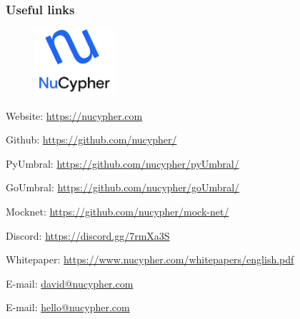 \documentclass[xetex,mathsans,sans,aspectratio=169]{beamer}
\begin{document}
    \begin{frame}
        \frametitle{Useful links}
        \begin{figure}
            \centering
            \includegraphics[width=3cm]{pdf/nucypher_logo.pdf}
        \end{figure}
        Website: \url{https://nucypher.com}

        Github: \url{https://github.com/nucypher/}

        PyUmbral: \url{https://github.com/nucypher/pyUmbral/}

        GoUmbral: \url{https://github.com/nucypher/goUmbral/}

        Mocknet: \url{https://github.com/nucypher/mock-net/}

        Discord: \url{https://discord.gg/7rmXa3S}

        Whitepaper: \url{https://www.nucypher.com/whitepapers/english.pdf}

        E-mail: \url{david@nucypher.com}

        E-mail: \url{hello@nucypher.com}
    \end{frame}
\end{document}
